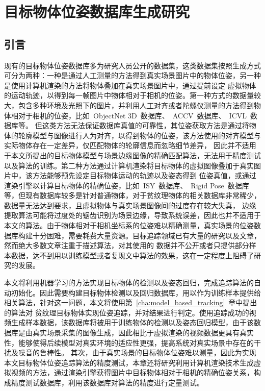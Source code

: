 \chapter{目标物体位姿数据库生成研究}
\label{cha:dataset}
\section{引言}
\label{sec:chap03:intro}
现有的目标物体位姿数据库多为研究人员公开的数据集，这类数据集按照生成方式可分为两种：一种是通过人工测量的方法得到真实场景图片中的物体位姿，另一种是使用计算机渲染的方法将物体叠加在真实场景图片中，通过提前设定
虚拟物体的运动轨迹，以得到每一帧图片中物体相对于相机的位姿。第一种方式的数据量较大，包含多种环境及光照下的图片，并利用人工对齐或者陀螺仪测量的方法得到物体相对于相机的位姿，比如~ObjectNet 3D\cite{XiangObjectnet3dLargeScale2016}~数据库、~ACCV~数据库\cite{HinterstoisserGradientResponseMaps2012}、~ICVL~数据库\cite{DoumanoglouRecovering6DObject2015}等。
但这类方法无法保证数据库真值的可靠性，其位姿获取方法是通过将物体的轮廓模型与图像进行人为对齐，以得到物体的位姿，该方法使用的对齐模型与实际物体存在一定差异，仅匹配物体的轮廓信息而忽略细节差异，
因此并不适用于本文所提出的目标物体模型与场景边缘图像的精确匹配算法，无法用于精度测试以及算法的训练。第二种方法通过计算机渲染将目标物体的虚拟图像叠加于真实图片中，该方法能够预先设定目标物体运动的轨迹以及姿态得到
位姿真值，或通过渲染引擎以计算目标物体的精确位姿，比如~ISY~数据库\cite{VikstenComparisonLocalImage2009}、~Rigid Pose~数据库\cite{PauwelsRealTimeModelBasedRigid2013}等，但现有数据库较多是针对普通物体，对于贫纹理物体的相关数据库非常稀少，数据量无法达到要求，且虚拟物体与真实场景图像间的过度存在较大失真，
边缘提取算法可能将过度处的锯齿识别为场景边缘，导致系统误差，因此也并不适用于本文的算法。由于物体相对于相机坐标系的位姿难以精确测量，真实场景的位姿数据库构建十分困难，需要耗费大量资源。目标追踪领域已有大量的研究以及文章，然而绝大多数文章注重于描述算法，对其使用的
数据并不公开或者只提供部分样本数据，达不到用以训练模型或者复现文中算法的效果，这在一定程度上阻碍了研究的发展。

本文将利用机器学习的方法实现目标物体的检测以及姿态回归，完成追踪算法的自动初始化。因此需要构建目标物体检测以及回归数据库，用以作为训练样本提供给相关算法，针对这一问题，本文将使用第~\ref{cha:model_based_tracking}~章中提出的算法对
贫纹理目标物体实现位姿追踪，并对结果进行判定。使用追踪成功的视频生成样本数据，该数据库将被用于训练物体的检测以及姿态回归模型，由于该数据库是由真实场景采集的图像生成，因此相比于虚拟渲染的视频数据更具有真实性，能够使得后续模型对真实环境的适应性更强，提高系统对真实场景中存在的干扰及噪音的鲁棒性。
其次，由于真实场景的目标物体位姿难以测量，因此为实现本文目标物体位姿追踪算法的精度测试，本章还将研究利用计算机渲染技术生成虚拟视频的方法，通过渲染引擎获得图片中目标物体相对于相机的精确位姿关系，构成精度测试数据库，利用该数据库对算法的精度进行定量测试。

